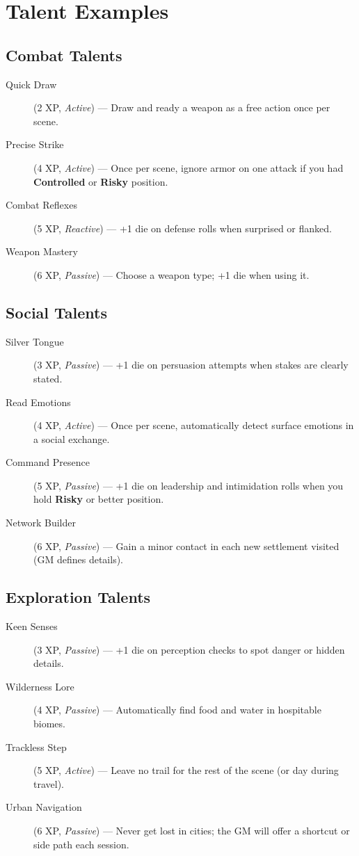 \section{Talent Examples}

\subsection*{Combat Talents}
\begin{description}
\item[Quick Draw] (2 XP, \emph{Active}) --- Draw and ready a weapon as a free action once per scene.
\item[Precise Strike] (4 XP, \emph{Active}) --- Once per scene, ignore armor on one attack if you had \textbf{Controlled} or \textbf{Risky} position.
\item[Combat Reflexes] (5 XP, \emph{Reactive}) --- +1 die on defense rolls when surprised or flanked.
\item[Weapon Mastery] (6 XP, \emph{Passive}) --- Choose a weapon type; +1 die when using it.
\end{description}

\subsection*{Social Talents}
\begin{description}
\item[Silver Tongue] (3 XP, \emph{Passive}) --- +1 die on persuasion attempts when stakes are clearly stated.
\item[Read Emotions] (4 XP, \emph{Active}) --- Once per scene, automatically detect surface emotions in a social exchange.
\item[Command Presence] (5 XP, \emph{Passive}) --- +1 die on leadership and intimidation rolls when you hold \textbf{Risky} or better position.
\item[Network Builder] (6 XP, \emph{Passive}) --- Gain a minor contact in each new settlement visited (GM defines details).
\end{description}

\subsection*{Exploration Talents}
\begin{description}
\item[Keen Senses] (3 XP, \emph{Passive}) --- +1 die on perception checks to spot danger or hidden details.
\item[Wilderness Lore] (4 XP, \emph{Passive}) --- Automatically find food and water in hospitable biomes.
\item[Trackless Step] (5 XP, \emph{Active}) --- Leave no trail for the rest of the scene (or day during travel).
\item[Urban Navigation] (6 XP, \emph{Passive}) --- Never get lost in cities; the GM will offer a shortcut or side path each session.
\end{description}

